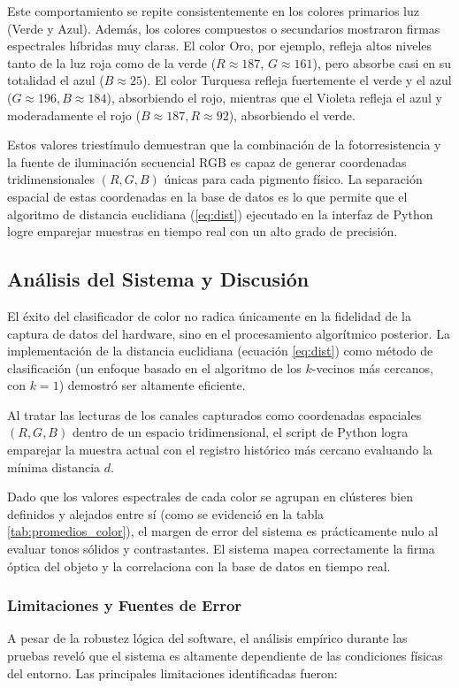 \documentclass[conference]{IEEEtran}
\begin{document}
Este comportamiento se repite consistentemente en los colores primarios luz (Verde y Azul). Además, los colores compuestos o secundarios mostraron firmas espectrales híbridas muy claras. El color Oro, por ejemplo, refleja altos niveles tanto de la luz roja como de la verde ($R \approx 187$, $G \approx 161$), pero absorbe casi en su totalidad el azul ($B \approx 25$). El color Turquesa refleja fuertemente el verde y el azul ($G \approx 196, B \approx 184$), absorbiendo el rojo, mientras que el Violeta refleja el azul y moderadamente el rojo ($B \approx 187, R \approx 92$), absorbiendo el verde.

Estos valores triestímulo demuestran que la combinación de la fotorresistencia y la fuente de iluminación secuencial RGB es capaz de generar coordenadas tridimensionales $(R, G, B)$ únicas para cada pigmento físico. La separación espacial de estas coordenadas en la base de datos es lo que permite que el algoritmo de distancia euclidiana (\ref{eq:dist}) ejecutado en la interfaz de Python logre emparejar muestras en tiempo real con un alto grado de precisión.

\subsection{Análisis del Sistema y Discusión}

El éxito del clasificador de color no radica únicamente en la fidelidad de la captura de datos del hardware, sino en el procesamiento algorítmico posterior. La implementación de la distancia euclidiana (ecuación \ref{eq:dist}) como método de clasificación (un enfoque basado en el algoritmo de los $k$-vecinos más cercanos, con $k=1$) demostró ser altamente eficiente. 

Al tratar las lecturas de los canales capturados como coordenadas espaciales $(R, G, B)$ dentro de un espacio tridimensional, el script de Python logra emparejar la muestra actual con el registro histórico más cercano evaluando la mínima distancia $d$.

Dado que los valores espectrales de cada color se agrupan en clústeres bien definidos y alejados entre sí (como se evidenció en la tabla \ref{tab:promedios_color}), el margen de error del sistema es prácticamente nulo al evaluar tonos sólidos y contrastantes. El sistema mapea correctamente la firma óptica del objeto y la correlaciona con la base de datos en tiempo real.

\subsubsection*{Limitaciones y Fuentes de Error}
A pesar de la robustez lógica del software, el análisis empírico durante las pruebas reveló que el sistema es altamente dependiente de las condiciones físicas del entorno. Las principales limitaciones identificadas fueron:
\end{document}
